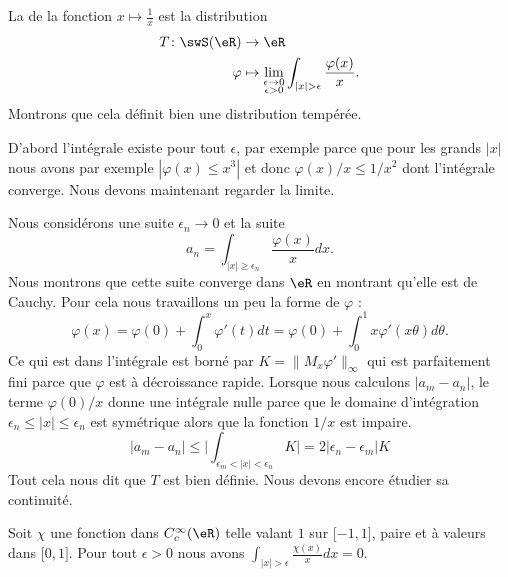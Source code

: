 \begin{example}
    La  de la fonction \( x\mapsto \frac{1}{ x }\) est la distribution
    \begin{equation}
        \begin{aligned}
            T\colon \swS(\eR)&\to \eR \\
            \varphi&\mapsto \lim_{\substack{\epsilon\to 0\\\epsilon>0}}\int_{| x |>\epsilon}\frac{ \varphi(x) }{ x }.
        \end{aligned}
    \end{equation}
    Montrons que cela définit bien une distribution tempérée.

    D'abord l'intégrale existe pour tout \( \epsilon\), par exemple parce que pour les grands \( | x |\) nous avons par exemple \( | \varphi(x)\leq x^3 |\) et donc \( \varphi(x)/x\leq 1/x^2\) dont l'intégrale converge. Nous devons maintenant regarder la limite.

    Nous considérons une suite \( \epsilon_n\to 0\) et la suite
    \begin{equation}
        a_n=\int_{| x |\geq \epsilon_n}\frac{ \varphi(x) }{ x }dx.
    \end{equation}
    Nous montrons que cette suite converge dans \( \eR\) en montrant qu'elle est de Cauchy. Pour cela nous travaillons un peu la forme de \( \varphi\) :
    \begin{equation}
        \varphi(x)=\varphi(0)+\int_0^x\varphi'(t)dt=\varphi(0)+\int_0^1x\varphi'(x\theta)d\theta.
    \end{equation}
    Ce qui est dans l'intégrale est borné par \( K=\| M_x\varphi' \|_{\infty}\) qui est parfaitement fini parce que \( \varphi\) est à décroissance rapide. Lorsque nous calculons \( | a_m-a_n |\), le terme \( \varphi(0)/x\) donne une intégrale nulle parce que le domaine d'intégration \( \epsilon_n\leq | x |\leq \epsilon_n\) est symétrique alors que la fonction \( 1/x\) est impaire.
    \begin{equation}
        | a_m-a_n |\leq \big| \int_{\epsilon_m<| x |<\epsilon_n}K \big|=2| \epsilon_n-\epsilon_m |K
    \end{equation}
    Tout cela nous dit que \( T\) est bien définie. Nous devons encore étudier sa continuité.

    Soit \( \chi\) une fonction dans \(  C^{\infty}_c(\eR)\) telle valant \( 1\) sur \( \mathopen[ -1 , 1 \mathclose]\), paire et à valeurs dans \( \mathopen[ 0 , 1 \mathclose]\).
    Pour tout \( \epsilon>0\) nous avons \( \int_{| x |>\epsilon}\frac{ \chi(x) }{ x }dx=0\).


\end{example}
